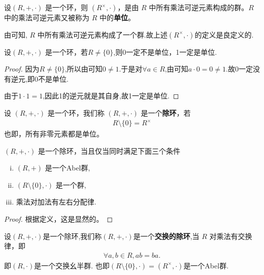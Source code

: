 \documentclass[../../main.tex]{subfiles}
\begin{document}
\begin{definition}[单位及所有单位构成的群]
设$(R, +, \cdot)$ 是一个环，则 $(R^\times, \cdot)$，是由 $R$ 中所有乘法可逆元素构成的群。$R$ 中的乘法可逆元素又被称为 $R$ 中的\textbf{单位}。 
\end{definition}
\begin{remark}
由可知, $R$ 中所有乘法可逆元素构成了一个群.故上述$(R^\times, \cdot)$的定义是良定义的.
\end{remark}

\begin{proposition}\label{proposition:非零环中0不是单位,1是单位}
设$(R, +, \cdot)$ 是一个环，若$R\ne \{0\}$,则0一定不是单位，1一定是单位.
\end{proposition}
\begin{proof}
因为$R\ne \{0\}$,所以由可知$0\ne 1$.于是对$\forall a\in R$,由可知$a\cdot 0=0\ne 1.$故0一定没有逆元,即0不是单位.

由于$1\cdot 1=1$,因此1的逆元就是其自身,故1一定是单位.
\end{proof}

\begin{definition}[除环]
设 $(R, +, \cdot)$ 是一个环，我们称 $(R, +, \cdot)$ 是一个\textbf{除环}，若
\begin{align*}
R\setminus\{0\} = R^\times
\end{align*}
也即，所有非零元素都是单位。 
\end{definition}

\begin{proposition}[除环的充要条件]\label{proposition:除环的充要条件}
$(R, +, \cdot)$ 是一个除环，当且仅当同时满足下面三个条件
\begin{enumerate}[(i)]
\item $(R, +)$  是一个Abel群,

\item $(R\setminus\{0\}, \cdot)$ 是一个群,

\item 乘法对加法有左右分配律.
\end{enumerate}
\end{proposition}
\begin{proof}
根据定义，这是显然的。
\end{proof}

\begin{definition}[交换的除环]
设$(R,+,\cdot)$是一个除环,我们称$(R,+,\cdot)$是一个\textbf{交换的除环},当 $R$ 对乘法有交换律，即
\begin{align*}
\forall a,b\in R, ab = ba.
\end{align*}
即$(R,\cdot)$是一个交换幺半群.
也即$(R\setminus\{0\}, \cdot)=(R^\times,\cdot)$是一个Abel群.
\end{definition}
\end{document}
